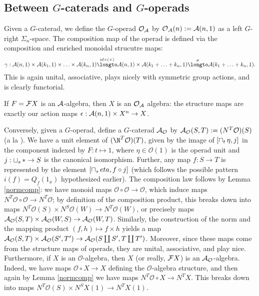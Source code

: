 \documentclass{report}
\newcommand{\icap}{\operatornamewithlimits{\sqcap}}
\newcommand{\ico}{\operatornamewithlimits{\sqcup}}
\renewcommand{\O}{\text{$\mathcal{O}$}}
\begin{document}
\subsection{Between $G$-caterads and $G$-operads}
Given a $G$-caterad, we define the $G$-operad $\O_\A$ by $\O_\A(n) := \A(n,1)$ as a left $G$- right $\Sigma_n$-space. The composition map of the operad is defined via the composition and enriched monoidal strucutre maps:
\[\gamma: \A(n,1)\times \A(k_1,1)\times\ldots\times\A(k_n,1) \overset{id\times (\times)}{\longto} \A(n,1)\times \A(k_1+\ldots+k_n,1) \overset{\mu}{\longto} \A(k_1+\ldots+k_n,1).\]
This is again unital, associative, plays nicely with symmetric group actions, and is clearly functorial.

If $F = \text{$\mathcal{F}$} X$ is an $\text{$\mathcal{A}$}$-algebra, then $X$ is an $\O_\A$ algebra: the structure maps are exactly our action maps $\epsilon:\text{$\mathcal{A}$}(n,1)\times X^n\to X$. 

Conversely, given a $G$-operad, define a $G$-caterad $\A_\O$ by $\A_\O(S,T):= (N^T\O)(S)$ (a la \cite{kelly_operads_2005}). We have a unit element of $(\N^T\O)(T)$, given by the image of $[\icap_t\eta,j]$ in the component indexed by $F: t\mapsto 1$, where $\eta\in\O(1)$ is the operad unit and $j: \ico_s*\to S$ is the canonical isomorphism. Further, any map $f: S\to T$ is represented by the element $[\icap_seta,f\circ j]$ (which follows the possible pattern $i(f) = Q_f(1_x)$ hypothesized earlier).
The composition law follows by Lemma \ref{normcomp}: we have monoid maps $\O\circ \O \to \O$, which induce maps $N^T\O\circ \O \to N^T\O$; by definition of the composition product, this breaks down into maps $N^T\O(S)\times N^S\O(W) \to N^T\O(W)$, or precisely maps $\A_\O(S,T)\times\A_\O(W,S)\to \A_\O(W,T)$. Similarly, the construction of the norm and the mapping product $(f,h)\mapsto f\times h$ yields a map $\A_\O(S,T)\times \A_\O(S',T')\to\A_\O(S\coprod S', T\coprod T')$. Moreover, since these maps come from the structure maps of operads, they are unital, associative, and play nice.
Furthermore, if $X$ is an $\O$-algebra, then $X$ (or really, $\text{$\mathcal{F}$} X$) is an $\A_\O$-algebra. Indeed, we have maps $\O\circ X\to X$ defining the $\O$-algebra structure, and then again by Lemma \ref{normcomp} we have maps $N^T\O\circ X\to N^TX$. This breaks down into maps $N^T\O(S)\times N^SX(1)\to N^TX(1)$.
\end{document}
